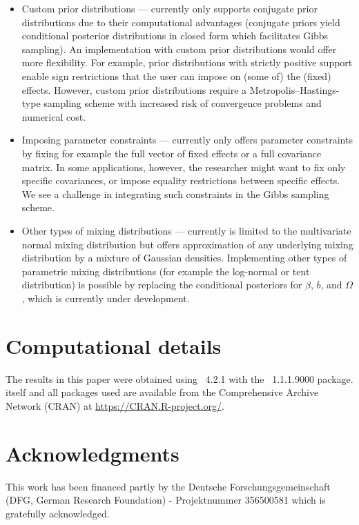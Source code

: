 \documentclass[article,shortnames]{jss}
\begin{document}
\begin{itemize}
  \item Custom prior distributions ---  currently only supports conjugate prior distributions due to their computational advantages (conjugate priors yield conditional posterior distributions in closed form which facilitates Gibbs sampling). An implementation with custom prior distributions would offer more flexibility. For example, prior distributions with strictly positive support enable sign restrictions that the user can impose on (some of) the (fixed) effects. However, custom prior distributions require a Metropolis–Hastings-type sampling scheme with increased risk of convergence problems and numerical cost.
  \item Imposing parameter constraints ---  currently only offers parameter constraints by fixing for example the full vector of fixed effects or a full covariance matrix. In some applications, however, the researcher might want to fix only specific covariances, or impose equality restrictions between specific effects. We see a challenge in integrating such constraints in the Gibbs sampling scheme.
  \item Other types of mixing distributions ---  currently is limited to the multivariate normal mixing distribution but offers approximation of any underlying mixing distribution by a mixture of Gaussian densities. Implementing other types of parametric mixing distributions (for example the log-normal or tent distribution) is possible by replacing the conditional posteriors for $\beta$, $b$, and $\Omega$, which is currently under development.
\end{itemize}

\section*{Computational details}

The results in this paper were obtained using
~4.2.1 with the
~1.1.1.9000 package.  itself
and all packages used are available from the Comprehensive
 Archive Network (CRAN) at \url{https://CRAN.R-project.org/}.


\section*{Acknowledgments}

This work has been financed partly by the Deutsche Forschungsgemeinschaft (DFG, German Research Foundation) - Projektnummer 356500581 which is gratefully acknowledged.


\end{document}
